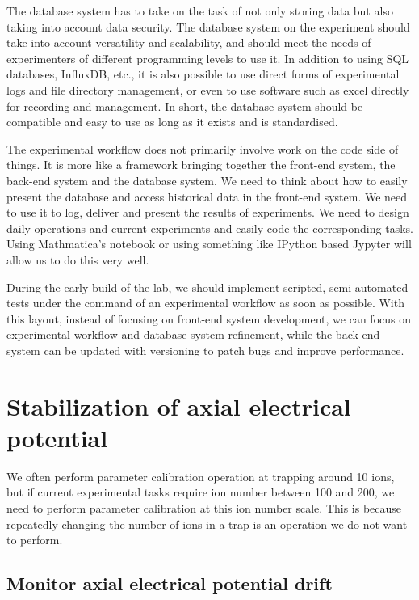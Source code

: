 The database system has to take on the task of not only storing data but also taking into account data security. The database system on the experiment should take into account versatility and scalability, and should meet the needs of experimenters of different programming levels to use it. In addition to using SQL databases, InfluxDB, etc., it is also possible to use direct forms of experimental logs and file directory management, or even to use software such as excel directly for recording and management. In short, the database system should be compatible and easy to use as long as it exists and is standardised.

The experimental workflow does not primarily involve work on the code side of things. It is more like a framework bringing together the front-end system, the back-end system and the database system. We need to think about how to easily present the database and access historical data in the front-end system. We need to use it to log, deliver and present the results of experiments. We need to design daily operations and current experiments and easily code the corresponding tasks. Using Mathmatica's notebook or using something like IPython based Jypyter will allow us to do this very well.

During the early build of the lab, we should implement scripted, semi-automated tests under the command of an experimental workflow as soon as possible. With this layout, instead of focusing on front-end system development, we can focus on experimental workflow and database system refinement, while the back-end system can be updated with versioning to patch bugs and improve performance.



\section{Stabilization of axial electrical potential}

We often perform parameter calibration operation at trapping around 10 ions, but if current experimental tasks require ion number between 100 and 200, we need to perform parameter calibration at this ion number scale. This is because repeatedly changing the number of ions in a trap is an operation we do not want to perform.

\subsection{Monitor axial electrical potential drift}

